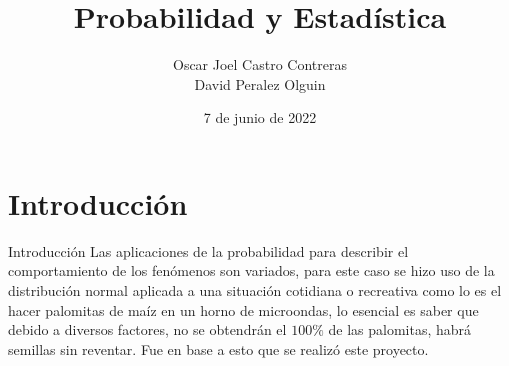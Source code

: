 \documentclass[11pt]{beamer}
\author[Oscar - David \hspace{22.5mm}]{Oscar Joel Castro Contreras \\ David Peralez Olguin}
\title[\hspace{26mm} \insertframenumber]{Probabilidad y Estadística}
\institute{Universidad Autónoma de Coahuila}
\date{7 de junio de 2022}
\begin{document}

	\begin{frame}
		\titlepage
	\end{frame}

	\begin{frame}
		\tableofcontents
	\end{frame}


	\section{Introducción}
		\begin{frame}{Introducción}
			Las aplicaciones de la probabilidad para describir el comportamiento de los fenómenos son 
			variados, para este caso se hizo uso de la distribución normal aplicada a una situación cotidiana o 
			recreativa como lo es el hacer palomitas de maíz en un horno de microondas, lo esencial es saber 
			que debido a diversos factores, no se obtendrán el $ 100\% $ de las palomitas, habrá semillas sin 
			reventar. Fue en base a esto que se realizó este proyecto.
		\end{frame}
		
\end{document}
